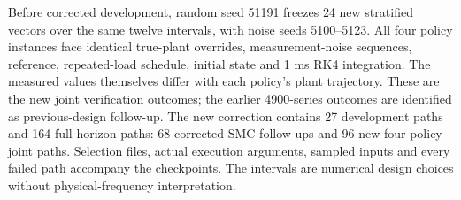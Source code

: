 Before corrected development, random seed 51191 freezes 24 new stratified vectors over the same twelve intervals, with noise seeds 5100--5123. All four policy instances face identical true-plant overrides, measurement-noise sequences, reference, repeated-load schedule, initial state and 1 ms RK4 integration. The measured values themselves differ with each policy's plant trajectory. These are the new joint verification outcomes; the earlier 4900-series outcomes are identified as previous-design follow-up. The new correction contains 27 development paths and 164 full-horizon paths: 68 corrected SMC follow-ups and 96 new four-policy joint paths. Selection files, actual execution arguments, sampled inputs and every failed path accompany the checkpoints. The intervals are numerical design choices without physical-frequency interpretation.
